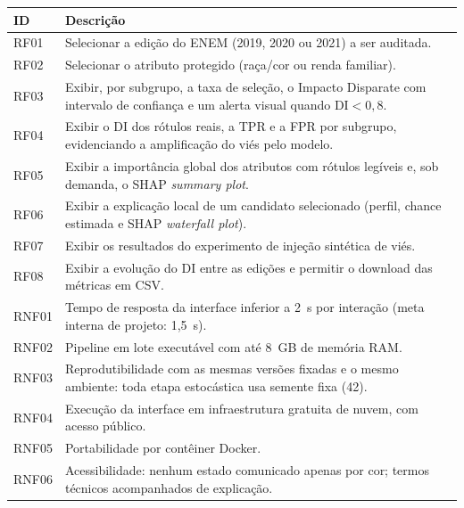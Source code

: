 \begin{quadro}[htbp]
\centering
\caption{Requisitos funcionais (RF) e não funcionais (RNF) do artefato}
\label{qua:requisitos}
\begin{tabular}{|p{1.4cm}|p{13.1cm}|}
\hline
\textbf{ID} & \textbf{Descrição} \\ \hline
RF01 & Selecionar a edição do ENEM (2019, 2020 ou 2021) a ser auditada. \\ \hline
RF02 & Selecionar o atributo protegido (raça/cor ou renda familiar). \\ \hline
RF03 & Exibir, por subgrupo, a taxa de seleção, o Impacto Disparate com intervalo de confiança e um alerta visual quando $\mathrm{DI} < 0{,}8$. \\ \hline
RF04 & Exibir o DI dos rótulos reais, a TPR e a FPR por subgrupo, evidenciando a amplificação do viés pelo modelo. \\ \hline
RF05 & Exibir a importância global dos atributos com rótulos legíveis e, sob demanda, o SHAP \textit{summary plot}. \\ \hline
RF06 & Exibir a explicação local de um candidato selecionado (perfil, chance estimada e SHAP \textit{waterfall plot}). \\ \hline
RF07 & Exibir os resultados do experimento de injeção sintética de viés. \\ \hline
RF08 & Exibir a evolução do DI entre as edições e permitir o download das métricas em CSV. \\ \hline
RNF01 & Tempo de resposta da interface inferior a 2~s por interação (meta interna de projeto: 1,5~s). \\ \hline
RNF02 & Pipeline em lote executável com até 8~GB de memória RAM. \\ \hline
RNF03 & Reprodutibilidade com as mesmas versões fixadas e o mesmo ambiente: toda etapa estocástica usa semente fixa (42). \\ \hline
RNF04 & Execução da interface em infraestrutura gratuita de nuvem, com acesso público. \\ \hline
RNF05 & Portabilidade por contêiner Docker. \\ \hline
RNF06 & Acessibilidade: nenhum estado comunicado apenas por cor; termos técnicos acompanhados de explicação. \\ \hline
\end{tabular}
\end{quadro}

